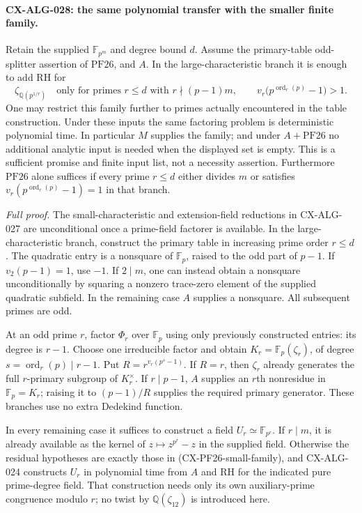 \paragraph{CX-ALG-028: the same polynomial transfer with the smaller finite family.}
Retain the supplied $\mathbb F_{p^m}$ and degree bound $d$.
Assume the primary-table odd-splitter assertion of
$\mathrm{PF26}$, and $A$. In the large-characteristic branch it
is enough to add RH for
\[
 \zeta_{\mathbb Q(p^{1/r})}
 \quad\text{only for primes }r\le d\text{ with }
 r\nmid(p-1)m,\qquad
 v_r\bigl(p^{\operatorname{ord}_r(p)}-1\bigr)>1.
 \tag{CX-PF26-small-family}
\]
One may restrict this family further to primes actually encountered
in the table construction. Under these inputs the same factoring
problem is deterministic polynomial time. In particular $M$ supplies
the family; and under $A+\mathrm{PF26}$ no additional analytic input
is needed when the displayed set is empty. This is a sufficient
promise and finite input list, not a necessity assertion.
Furthermore $\mathrm{PF26}$ alone suffices if every prime $r\le d$
either divides $m$ or satisfies
$v_r(p^{\operatorname{ord}_r(p)}-1)=1$ in that branch.

\emph{Full proof.}
The small-characteristic and extension-field reductions in
CX-ALG-027 are unconditional once a prime-field factorer is
available. In the large-characteristic branch, construct the
primary table in increasing prime order $r\le d$. The quadratic
entry is a nonsquare of $\mathbb F_p$, raised to the odd part of
$p-1$. If $v_2(p-1)=1$, use $-1$. If $2\mid m$, one can
instead obtain a nonsquare unconditionally by squaring a nonzero
trace-zero element of the supplied quadratic subfield. In the
remaining case $A$ supplies a nonsquare. All subsequent primes
are odd.

At an odd prime $r$, factor $\Phi_r$ over $\mathbb F_p$ using
only previously constructed entries: its degree is $r-1$.
Choose one irreducible factor and obtain
$K_r=\mathbb F_p(\zeta_r)$, of degree
$s=\operatorname{ord}_r(p)\mid r-1$. Put
$R=r^{v_r(p^s-1)}$.
If $R=r$, then $\zeta_r$ already generates the full
$r$-primary subgroup of $K_r^\times$. If $r\mid p-1$,
$A$ supplies an $r$th nonresidue in $\mathbb F_p=K_r$;
raising it to $(p-1)/R$ supplies the required primary generator.
These branches use no extra Dedekind function.

In every remaining case it suffices to construct a field
$U_r\simeq\mathbb F_{p^r}$. If $r\mid m$, it is already
available as the kernel of $z\mapsto z^{p^r}-z$ in the supplied
field. Otherwise the residual hypotheses are exactly those in
(CX-PF26-small-family), and CX-ALG-024 constructs $U_r$ in
polynomial time from $A$ and RH for the indicated pure
prime-degree field. That construction needs only its own
auxiliary-prime congruence modulo $r$; no twist by
$\mathbb Q(\zeta_{12})$ is introduced here.

